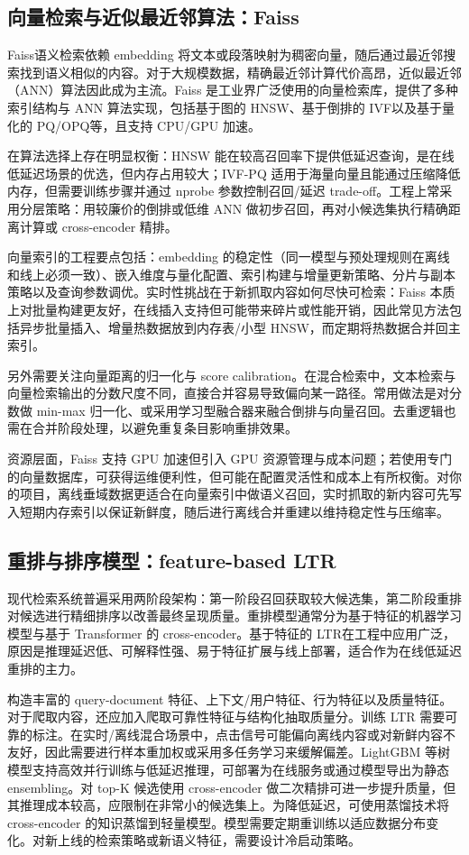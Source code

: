 \subsection{向量检索与近似最近邻算法：Faiss}
Faiss\cite{Amanbayev2026FAISS}语义检索依赖 embedding 将文本或段落映射为稠密向量，随后通过最近邻搜索找到语义相似的内容。对于大规模数据，精确最近邻计算代价高昂，近似最近邻（ANN）算法因此成为主流。Faiss 是工业界广泛使用的向量检索库，提供了多种索引结构与 ANN 算法实现，包括基于图的 HNSW、基于倒排的 IVF以及基于量化的 PQ/OPQ等，且支持 CPU/GPU 加速。

在算法选择上存在明显权衡：HNSW 能在较高召回率下提供低延迟查询，是在线低延迟场景的优选，但内存占用较大；IVF-PQ 适用于海量向量且能通过压缩降低内存，但需要训练步骤并通过 nprobe 参数控制召回/延迟 trade-off。工程上常采用分层策略：用较廉价的倒排或低维 ANN 做初步召回，再对小候选集执行精确距离计算或 cross-encoder 精排。

向量索引的工程要点包括：embedding 的稳定性（同一模型与预处理规则在离线和线上必须一致）、嵌入维度与量化配置、索引构建与增量更新策略、分片与副本策略以及查询参数调优。实时性挑战在于新抓取内容如何尽快可检索：Faiss 本质上对批量构建更友好，在线插入支持但可能带来碎片或性能开销，因此常见方法包括异步批量插入、增量热数据放到内存表/小型 HNSW，而定期将热数据合并回主索引。

另外需要关注向量距离的归一化与 score calibration。在混合检索中，文本检索与向量检索输出的分数尺度不同，直接合并容易导致偏向某一路径。常用做法是对分数做 min-max 归一化、或采用学习型融合器来融合倒排与向量召回。去重逻辑也需在合并阶段处理，以避免重复条目影响重排效果。

资源层面，Faiss 支持 GPU 加速但引入 GPU 资源管理与成本问题；若使用专门的向量数据库，可获得运维便利性，但可能在配置灵活性和成本上有所权衡。对你的项目，离线垂域数据更适合在向量索引中做语义召回，实时抓取的新内容可先写入短期内存索引以保证新鲜度，随后进行离线合并重建以维持稳定性与压缩率。

\subsection{重排与排序模型：feature-based LTR}
现代检索系统普遍采用两阶段架构：第一阶段召回获取较大候选集，第二阶段重排对候选进行精细排序以改善最终呈现质量。重排模型通常分为基于特征的机器学习模型与基于 Transformer 的 cross-encoder。基于特征的 LTR\cite{Chavhan2022LTR}在工程中应用广泛，原因是推理延迟低、可解释性强、易于特征扩展与线上部署，适合作为在线低延迟重排的主力。

构造丰富的 query-document 特征、上下文/用户特征、行为特征以及质量特征。对于爬取内容，还应加入爬取可靠性特征与结构化抽取质量分。训练 LTR 需要可靠的标注。在实时/离线混合场景中，点击信号可能偏向离线内容或对新鲜内容不友好，因此需要进行样本重加权或采用多任务学习来缓解偏差。LightGBM 等树模型支持高效并行训练与低延迟推理，可部署为在线服务或通过模型导出为静态 ensembling。对 top-K 候选使用 cross-encoder 做二次精排可进一步提升质量，但其推理成本较高，应限制在非常小的候选集上。为降低延迟，可使用蒸馏技术将 cross-encoder 的知识蒸馏到轻量模型。模型需要定期重训练以适应数据分布变化。对新上线的检索策略或新语义特征，需要设计冷启动策略。

